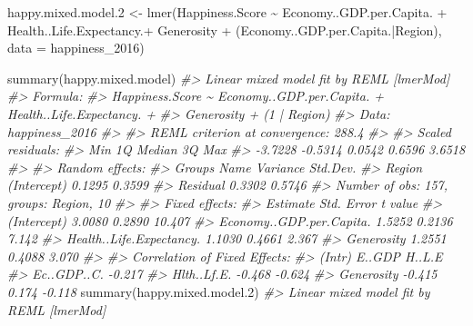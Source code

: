 \documentclass[
]{book}
\newenvironment{Shaded}{\begin{snugshade}}{\end{snugshade}}
\newcommand{\AttributeTok}[1]{\textcolor[rgb]{0.77,0.63,0.00}{#1}}
\newcommand{\CommentTok}[1]{\textcolor[rgb]{0.56,0.35,0.01}{\textit{#1}}}
\newcommand{\FloatTok}[1]{\textcolor[rgb]{0.00,0.00,0.81}{#1}}
\newcommand{\FunctionTok}[1]{\textcolor[rgb]{0.00,0.00,0.00}{#1}}
\newcommand{\NormalTok}[1]{#1}
\newcommand{\OtherTok}[1]{\textcolor[rgb]{0.56,0.35,0.01}{#1}}
\newcommand{\SpecialCharTok}[1]{\textcolor[rgb]{0.00,0.00,0.00}{#1}}
\theoremstyle{definition}
\theoremstyle{definition}
\theoremstyle{definition}
\theoremstyle{definition}
\theoremstyle{remark}
\begin{document}
\begin{Shaded}
\begin{Highlighting}[]
\NormalTok{happy.mixed.model}\FloatTok{.2} \OtherTok{\textless{}{-}}  \FunctionTok{lmer}\NormalTok{(Happiness.Score }\SpecialCharTok{\textasciitilde{}}\NormalTok{ Economy..GDP.per.Capita. }\SpecialCharTok{+}\NormalTok{ Health..Life.Expectancy.}\SpecialCharTok{+}\NormalTok{ Generosity }\SpecialCharTok{+}\NormalTok{ (Economy..GDP.per.Capita.}\SpecialCharTok{|}\NormalTok{Region), }
                             \AttributeTok{data =}\NormalTok{ happiness\_2016)}

\FunctionTok{summary}\NormalTok{(happy.mixed.model)}
\CommentTok{\#\textgreater{} Linear mixed model fit by REML [\textquotesingle{}lmerMod\textquotesingle{}]}
\CommentTok{\#\textgreater{} Formula: }
\CommentTok{\#\textgreater{} Happiness.Score \textasciitilde{} Economy..GDP.per.Capita. + Health..Life.Expectancy. +  }
\CommentTok{\#\textgreater{}     Generosity + (1 | Region)}
\CommentTok{\#\textgreater{}    Data: happiness\_2016}
\CommentTok{\#\textgreater{} }
\CommentTok{\#\textgreater{} REML criterion at convergence: 288.4}
\CommentTok{\#\textgreater{} }
\CommentTok{\#\textgreater{} Scaled residuals: }
\CommentTok{\#\textgreater{}     Min      1Q  Median      3Q     Max }
\CommentTok{\#\textgreater{} {-}3.7228 {-}0.5314  0.0542  0.6596  3.6518 }
\CommentTok{\#\textgreater{} }
\CommentTok{\#\textgreater{} Random effects:}
\CommentTok{\#\textgreater{}  Groups   Name        Variance Std.Dev.}
\CommentTok{\#\textgreater{}  Region   (Intercept) 0.1295   0.3599  }
\CommentTok{\#\textgreater{}  Residual             0.3302   0.5746  }
\CommentTok{\#\textgreater{} Number of obs: 157, groups:  Region, 10}
\CommentTok{\#\textgreater{} }
\CommentTok{\#\textgreater{} Fixed effects:}
\CommentTok{\#\textgreater{}                          Estimate Std. Error t value}
\CommentTok{\#\textgreater{} (Intercept)                3.0080     0.2890  10.407}
\CommentTok{\#\textgreater{} Economy..GDP.per.Capita.   1.5252     0.2136   7.142}
\CommentTok{\#\textgreater{} Health..Life.Expectancy.   1.1030     0.4661   2.367}
\CommentTok{\#\textgreater{} Generosity                 1.2551     0.4088   3.070}
\CommentTok{\#\textgreater{} }
\CommentTok{\#\textgreater{} Correlation of Fixed Effects:}
\CommentTok{\#\textgreater{}             (Intr) E..GDP H..L.E}
\CommentTok{\#\textgreater{} Ec..GDP..C. {-}0.217              }
\CommentTok{\#\textgreater{} Hlth..Lf.E. {-}0.468 {-}0.624       }
\CommentTok{\#\textgreater{} Generosity  {-}0.415  0.174 {-}0.118}
\FunctionTok{summary}\NormalTok{(happy.mixed.model}\FloatTok{.2}\NormalTok{)}
\CommentTok{\#\textgreater{} Linear mixed model fit by REML [\textquotesingle{}lmerMod\textquotesingle{}]}

\end{Highlighting}
\end{Shaded}
\end{document}
